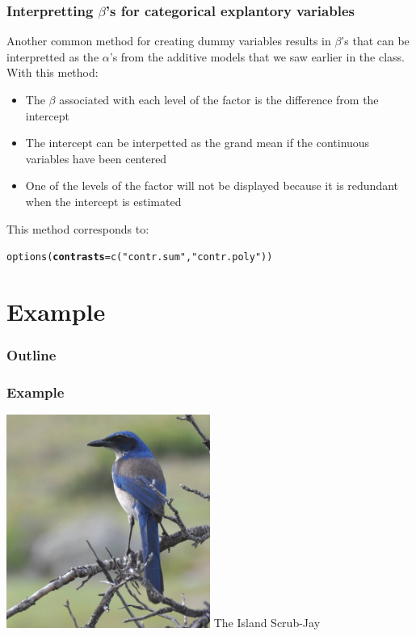\documentclass[color=usenames,dvipsnames]{beamer}\usepackage[]{graphicx}\usepackage[]{color}
\makeatletter
\newcommand{\hlstr}[1]{\textcolor[rgb]{0.749,0.012,0.012}{#1}}%
\newcommand{\hlstd}[1]{\textcolor[rgb]{0,0,0}{#1}}%
\newcommand{\hlkwc}[1]{\textcolor[rgb]{0,0,0}{\textbf{#1}}}%
\newcommand{\hlkwd}[1]{\textcolor[rgb]{0.004,0.004,0.506}{#1}}%
\newenvironment{kframe}{%
 \def\at@end@of@kframe{}%
 \ifinner\ifhmode%
  \def\at@end@of@kframe{\end{minipage}}%
  \begin{minipage}{\columnwidth}%
 \fi\fi%
 \def\FrameCommand##1{\hskip\@totalleftmargin \hskip-\fboxsep
 \colorbox{shadecolor}{##1}\hskip-\fboxsep
     \hskip-\linewidth \hskip-\@totalleftmargin \hskip\columnwidth}%
 \MakeFramed {\advance\hsize-\width
   \@totalleftmargin\z@ \linewidth\hsize
   \@setminipage}}%
 {\par\unskip\endMakeFramed%
 \at@end@of@kframe}
\newenvironment{knitrout}{}{} %
\makeatother
\begin{document}
\begin{frame}[fragile]
  \frametitle{\small Interpretting $\beta$'s for categorical explantory
    variables}
  Another common method for creating dummy variables results in
  $\beta$'s that can be interpretted as the $\alpha$'s from the
  additive models that we saw earlier in the class.
  \pause
  \vfill
  With this method:
  \begin{itemize}
    \item The $\beta$ associated with each level of the factor is the
      difference from the intercept
    \item The intercept can be interpetted as the grand mean if the
      continuous variables have been centered
    \item One of the levels of the factor will not be displayed
      because it is redundant when the intercept is estimated
  \end{itemize}
  \pause
  \vfill
  This method corresponds to:
\begin{knitrout}\small
{}\color{fgcolor}\begin{kframe}
\begin{alltt}
\hlkwd{options}\hlstd{(}\hlkwc{contrasts}\hlstd{=}\hlkwd{c}\hlstd{(}\hlstr{"contr.sum"}\hlstd{,}\hlstr{"contr.poly"}\hlstd{))}
\end{alltt}
\end{kframe}
\end{knitrout}
\end{frame}



\section{Example}


\begin{frame}
  \frametitle{Outline}
  \LARGE
\end{frame}



\begin{frame}[plain]
  \frametitle{Example}
  \Huge
  \begin{center}
    \includegraphics[width=0.5\textwidth]{figs/issj}
    The Island Scrub-Jay
  \end{center}
\end{frame}
\end{document}
